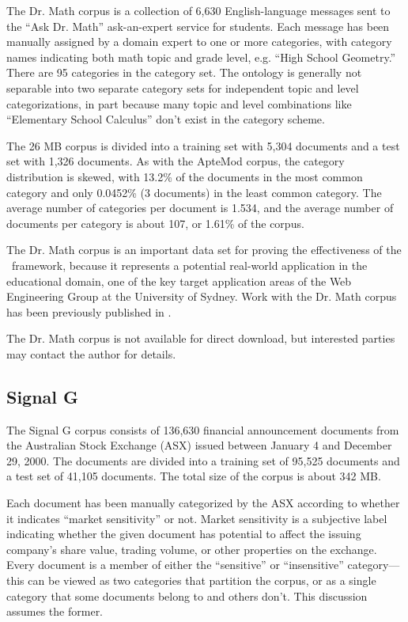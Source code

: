 The Dr. Math corpus is a collection of 6,630 English-language messages
sent to the ``Ask Dr. Math'' ask-an-expert service for
students. \cite{drmath} Each message has been manually assigned by a
domain expert to one or more categories,
with category names indicating both math topic and grade level,
e.g. ``High School Geometry.''  There are 95 categories in the
category set.  The ontology is generally not
separable into two separate category sets for independent topic and
level categorizations, in part because many topic and level
combinations like ``Elementary School Calculus'' don't exist in the
category scheme.

The 26 MB corpus is divided into a training set with 5,304 documents
and a test set with 1,326 documents.  As with the ApteMod corpus, the
category distribution is skewed, with 13.2\% of the documents in the
most common category and only 0.0452\% (3 documents) in the least
common category.  The average number of categories per document is
1.534, and the average number of documents per category is about 107,
or 1.61\% of the corpus.

The Dr. Math corpus is an important data set for proving the
effectiveness of the \aicat\ framework, because it represents a
potential real-world application in the educational domain, one of the key
target application areas of the Web Engineering Group at the
University of Sydney. Work with the Dr. Math corpus has been
previously published in \cite{williams:03}.

The Dr. Math corpus is not available for direct download, but interested
parties may contact the author for details.


\subsection{Signal G}

The Signal G corpus consists of 136,630 financial announcement
documents from the Australian Stock Exchange (ASX)\cite{asx:02} issued
between January 4 and December 29, 2000.  The documents are divided
into a training set of 95,525 documents and a test set of 41,105
documents.  The total size of the corpus is about 342 MB.

Each document has been
manually categorized by the ASX according to whether it indicates ``market
sensitivity'' or not.  Market sensitivity is a subjective label indicating
whether the given document has potential to affect the issuing
company's share value, trading volume, or other properties on the
exchange.  Every document is a member of either the ``sensitive'' or
``insensitive'' category---this can be viewed as two categories that
partition the corpus, or as a single category that some documents
belong to and others don't.  This discussion assumes the former.

